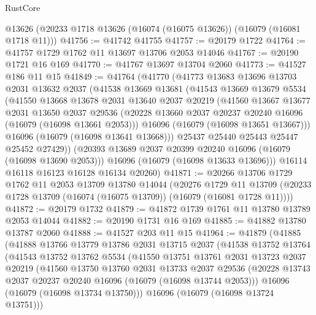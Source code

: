 \begin{lexlean}{RustCore}
\begin{coremodule}
    @13626
    (@20233 @1718 @13626 (@16074 (@16075 @13626)) (@16079 (@16081 @1718 @11)))
@41756 := @41742 @41755
@41757 := @20179 @1722
@41764 := @41757 @1729 @1762 @11 @13697 @13706 @2053 @14046
@41767 := @20190 @1721 @16 @169
@41770 := @41767 @13697 @13704 @2060
@41773 := @41527 @186 @11 @15
@41849 := @41764
    (@41770
      (@41773
        @13683
        @13696
        @13703
        @2031
        @13632
        @2037
        (@41538
          @13669
          @13681
          (@41543
            @13669
            @13679
            @5534
            (@41550
              @13668
              @13678
              @2031
              @13640
              @2037
              @20219
              (@41560
                @13667
                @13677
                @2031
                @13650
                @2037
                @29536
                (@20228 @13660 @2037 @20237 @20240 @16096 (@16079 (@16098 @13661 @2053)))
                @16096
                (@16079 (@16098 @13651 @13667)))
              @16096
              (@16079 (@16098 @13641 @13668)))
            @25437
            @25440
            @25443
            @25447
            @25452
            @27429))
        (@20393 @13689 @2037 @20399 @20240 @16096 (@16079 (@16098 @13690 @2053)))
        @16096
        (@16079 (@16098 @13633 @13696)))
      @16114
      @16118
      @16123
      @16128
      @16134
      @20260)
@41871 := @20266
    @13706
    @1729
    @1762
    @11
    @2053
    @13709
    @13780
    @14044
    (@20276
      @1729
      @11
      @13709
      (@20233 @1728 @13709 (@16074 (@16075 @13709)) (@16079 (@16081 @1728 @11))))
@41872 := @20179 @1732
@41879 := @41872 @1739 @1761 @11 @13780 @13789 @2053 @14044
@41882 := @20190 @1731 @16 @169
@41885 := @41882 @13780 @13787 @2060
@41888 := @41527 @203 @11 @15
@41964 := @41879
    (@41885
      (@41888
        @13766
        @13779
        @13786
        @2031
        @13715
        @2037
        (@41538
          @13752
          @13764
          (@41543
            @13752
            @13762
            @5534
            (@41550
              @13751
              @13761
              @2031
              @13723
              @2037
              @20219
              (@41560
                @13750
                @13760
                @2031
                @13733
                @2037
                @29536
                (@20228 @13743 @2037 @20237 @20240 @16096 (@16079 (@16098 @13744 @2053)))
                @16096
                (@16079 (@16098 @13734 @13750)))
              @16096
              (@16079 (@16098 @13724 @13751)))

\end{coremodule}
\end{lexlean}
